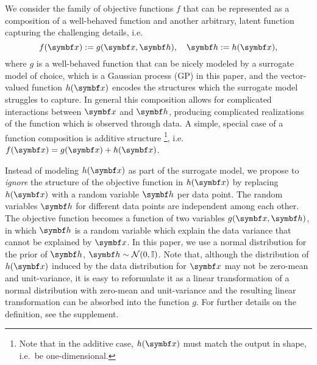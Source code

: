 We consider the family of objective functions $f$ that can be represented as a composition of a well-behaved function and another arbitrary, latent function capturing the challenging details, i.e.
\begin{equation}
    \label{eq:well_behaved}
    f(\mat{x}) := g(\mat{x}, \mat{h}), \quad \mat{h}:=h(\mat{x}),
\end{equation}
where $g$ is a well-behaved function that can be nicely modeled by a surrogate model of choice,
which is a Gaussian process (GP) in this paper,
and the vector-valued function $h(\mat{x})$ encodes the structures which the surrogate model struggles to capture.
In general this composition allows for complicated interactions between $\mat{x}$ and $\mat{h}$, producing complicated realizations of the function
which is observed through data.
A simple, special case of a function composition is additive structure
\footnote{Note that in the additive case, $h(\mat{x})$ must match the output in shape, i.e.~be one-dimensional.},
i.e.\ $f(\mat{x}) = g(\mat{x}) + h(\mat{x})$.

Instead of modeling $h(\mat{x})$ as part of the surrogate model,
we propose to \textit{ignore} the structure of the objective function in $h(\mat{x})$ by replacing $h(\mat{x})$ with a random variable $\mat{h}$ per data point.
The random variables $\mat{h}$ for different data points  are independent among each other.
The objective function becomes a function of two variables $g(\mat{x}, \mat{h})$,
in which $\mat{h}$ is a random variable which explain the data variance that cannot be explained by $\mat{x}$.
In this paper, we use a normal distribution for the prior of $\mat{h}$, $\mat{h} \sim \mathcal{N}(0,  \mathbb{I})$.
Note that, although the distribution of $h(\mat{x})$ induced by the data distribution for $\mat{x}$ may not be zero-mean and unit-variance, it is easy to reformulate it as a linear transformation of a normal distribution with zero-mean and unit-variance and the resulting linear transformation can be absorbed into the function $g$.
For further details on the definition, see the supplement.

